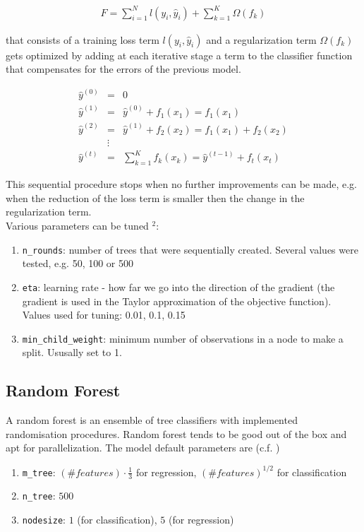 \documentclass[a4paper,12pt]{article}
\begin{document}
\begin{eqnarray*}
F = \displaystyle\sum_{i=1}^{N} l(y_i, \hat{y}_i) + \displaystyle\sum_{k=1}^{K} \Omega(f_k) 
\end{eqnarray*}

that consists of a training loss term $l(y_i,\hat{y}_i)$ and a regularization term $\Omega(f_k)$ gets optimized by adding at each iterative stage a term to the classifier function that compensates for the errors of the previous model. 

\begin{eqnarray*}
\hat{y}^{(0)} &=& 0       \\
\hat{y}^{(1)} &=& \hat{y}^{(0)} + f_1(x_1) =  f_1(x_1)   \\
\hat{y}^{(2)} &=& \hat{y}^{(1)}+f_2(x_2) = f_1(x_1) + f_2(x_2) \\
&\vdots& \\
\hat{y}^{(t)} &=& \displaystyle\sum_{k=1}^{K} f_k(x_k) = \hat{y}^{(t-1)} + f_t(x_t)
\end{eqnarray*}

This sequential procedure stops when no further improvements can be made, e.g. when the reduction of the loss term is smaller then the change in the regularization term. \\

Various parameters can be tuned $^2$: 
\begin{enumerate}
\item \texttt{n\_rounds}: number of trees that were sequentially created. Several values were tested, e.g. 50, 100 or 500
\item \texttt{eta}: learning rate - how far we go into the direction of the gradient (the gradient is used in the Taylor approximation of the objective function). Values used for tuning: 0.01, 0.1, 0.15
\item \texttt{min\_child\_weight}: minimum number of observations in a node to make a split. Ususally set to 1. 
\end{enumerate}

\subsection{Random Forest}
A random forest is an ensemble of tree classifiers with implemented
randomisation procedures.
Random forest tends to be good out of the box and apt for parallelization.
The model default parameters are (c.f. \cite{breiman2001random})
\begin{enumerate}
\item \texttt{m\_tree}:  $(\#features) \cdot \frac{1}{3} $ for regression,
$ (\#features)^{1/2}$ for classification
\item \texttt{n\_tree}:  $500$
\item \texttt{nodesize}: $1$ (for classification), $5$ (for regression)
\end{enumerate}
\end{document}
